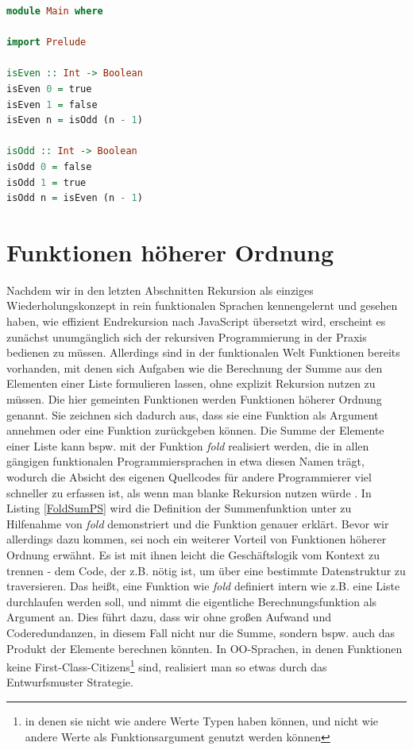 \documentclass[
12pt,
ngerman,
oneside]
{scrbook} %
\begin{document}
\begin{lstlisting}[language=purescript, style=numbered-and-boxed, caption=Wechselseitige Endrekursion in PureScript, label=WechselEndrekursionPS]
module Main where

import Prelude

isEven :: Int -> Boolean
isEven 0 = true
isEven 1 = false
isEven n = isOdd (n - 1)

isOdd :: Int -> Boolean
isOdd 0 = false
isOdd 1 = true
isOdd n = isEven (n - 1)
\end{lstlisting}

\section{Funktionen höherer Ordnung}
Nachdem wir in den letzten Abschnitten Rekursion als einziges Wiederholungskonzept in rein funktionalen Sprachen kennengelernt und gesehen haben, wie effizient Endrekursion nach JavaScript übersetzt wird, erscheint es zunächst unumgänglich sich der rekursiven Programmierung in der Praxis bedienen zu müssen. Allerdings sind in der funktionalen Welt Funktionen bereits vorhanden, mit denen sich Aufgaben wie die Berechnung der Summe aus den Elementen einer Liste formulieren lassen, ohne explizit Rekursion nutzen zu müssen. Die hier gemeinten Funktionen werden Funktionen höherer Ordnung genannt. Sie zeichnen sich dadurch aus, dass sie eine Funktion als Argument annehmen oder eine Funktion zurückgeben können. Die Summe der Elemente einer Liste kann bspw. mit der Funktion \emph{fold} realisiert werden, die in allen gängigen funktionalen Programmiersprachen in etwa diesen Namen trägt, wodurch  die Absicht des eigenen Quellcodes für andere Programmierer viel schneller zu erfassen ist, als wenn man blanke Rekursion nutzen würde \cite[][S. 44]{Freeman17}. In Listing \ref{FoldSumPS} wird die Definition der Summenfunktion unter zu Hilfenahme von \emph{fold} demonstriert und die Funktion genauer erklärt. Bevor wir allerdings dazu kommen, sei noch ein weiterer Vorteil von Funktionen höherer Ordnung erwähnt. Es ist mit ihnen leicht die Geschäftslogik vom Kontext zu trennen - dem Code, der z.B. nötig ist, um über eine bestimmte Datenstruktur zu traversieren. Das heißt, eine Funktion wie \emph{fold} definiert intern wie z.B. eine Liste durchlaufen werden soll, und nimmt die eigentliche Berechnungsfunktion als Argument an. Dies führt dazu, dass wir ohne großen Aufwand und Coderedundanzen, in diesem Fall nicht nur die Summe, sondern bspw. auch das Produkt der Elemente berechnen könnten. In OO-Sprachen, in denen Funktionen keine First-Class-Citizens\footnote{in denen sie nicht wie andere Werte Typen haben können, und nicht wie andere Werte als Funktionsargument genutzt werden können} sind, realisiert man so etwas durch das Entwurfsmuster Strategie.
\end{document}
